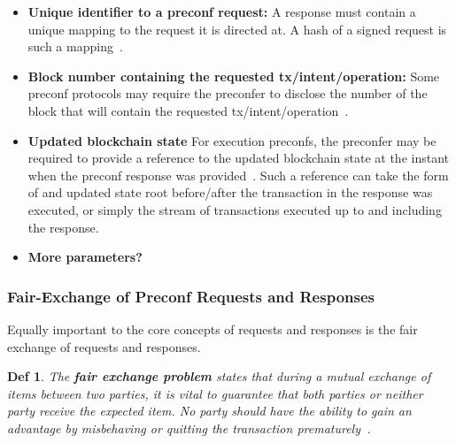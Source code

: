 \documentclass[a4paper]{article}
\theoremstyle{boldstyle}
\newtheorem*{definitionx}{Def}
\newenvironment{definition}
  {\begin{defopenboxq}\begin{definitionx}}
  {\end{definitionx}\end{defopenboxq}}
\begin{document}
    \begin{itemize}
        \item \textbf{Unique identifier to a preconf request:}
        A response must contain a unique mapping to the request it is directed at. A hash of a signed request is such a mapping~\cite{W:Documentation-Commitments}.
        
        \item \textbf{Block number containing the requested tx/intent/operation:} Some preconf protocols may require the preconfer to disclose the number of the block that will contain the requested tx/intent/operation~\cite{W:Towardsanimplementationofbasedpreconfirmationsleveragingrestaking}.

        \item \textbf{Updated blockchain state} For execution preconfs, the preconfer may be required to provide a reference to the updated blockchain state at the instant when the preconf response was provided~\cite{W:AnalyzingBFTProposer-PromisedPreconfirmations}. Such a reference can take the form of and updated state root before/after the transaction in the response was executed, or simply the stream of transactions executed up to and including the response.
        
        \item \textbf{More parameters?}
    \end{itemize}
    

\subsubsection{Fair-Exchange of Preconf Requests and Responses} \label{fair_exchange_problem}
    Equally important to the core concepts of requests and responses is the fair exchange of requests and responses. 
    \begin{definition}
        
    The \textbf{fair exchange problem} states that during a mutual exchange of items between two parties, it is vital to guarantee that both parties or neither party receive the expected item. No party should have the ability to gain an advantage by misbehaving or quitting the transaction prematurely~\cite{P:Fairexchangewithasemi-trustedthirdparty}.
    \end{definition}
\end{document}
